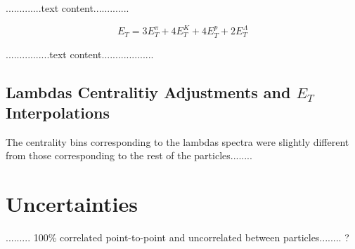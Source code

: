 	.............text content.............
	
	\begin{equation}\label{eqn:TotET}
	E_{T} = 3E_{T}^{\pi} + 4E_{T}^{K} + 4E_{T}^{p} + 2E_{T}^{\Lambda}
	\end{equation}
	
 ................text content...................
 
\subsection{Lambdas Centralitiy Adjustments and $E_{T}$ Interpolations}
The centrality bins corresponding to the lambdas spectra were slightly different from those corresponding to the rest of the particles........
\section{Uncertainties}
......... 100\% correlated point-to-point and uncorrelated between particles........ ?

